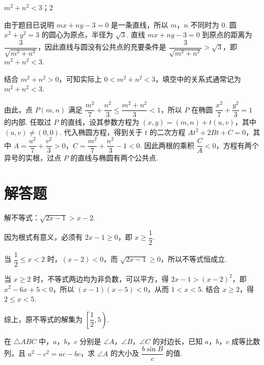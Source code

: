 \begin{answer}
\(m^{2}+n^{2}<3\)；\(2\)
\end{answer}

\begin{solution}
由于题目已说明 \(mx+ny-3=0\) 是一条直线，所以 \(m\)，\(n\) 不同时为 \(0\). 圆 \(x^{2}+y^{2}=3\) 的圆心为原点，半径为 \(\sqrt3\). 直线 \(mx+ny-3=0\) 到原点的距离为 \(\dfrac{3}{\sqrt{m^{2}+n^{2}}}\)，因此直线与圆没有公共点的充要条件是
\(\dfrac{3}{\sqrt{m^{2}+n^{2}}}>\sqrt3\)，即 \(m^{2}+n^{2}<3\).

结合 \(m^{2}+n^{2}>0\)，可知实际上 \(0<m^{2}+n^{2}<3\)，填空中的关系式通常记为 \(m^{2}+n^{2}<3\).

由此，点 \(P\left(m,n\right)\) 满足 \(\dfrac{m^{2}}{7}+\dfrac{n^{2}}{3}\leq\dfrac{m^{2}+n^{2}}{3}<1\)，所以 \(P\) 在椭圆 \(\dfrac{x^{2}}7+\dfrac{y^{2}}3=1\) 的内部. 任取过 \(P\) 的直线，设其参数方程为 \(\left(x,y\right)=\left(m,n\right)+t\left(u,v\right)\)，其中 \(\left(u,v\right)\ne\left(0,0\right)\). 代入椭圆方程，得到关于 \(t\) 的二次方程 \(At^{2}+2Bt+C=0\)，其中 \(A=\dfrac{u^{2}}7+\dfrac{v^{2}}3>0\)，\(C=\dfrac{m^{2}}7+\dfrac{n^{2}}3-1<0\). 因此两根的乘积 \(\dfrac{C}{A}<0\)，方程有两个异号的实根，过点 \(P\) 的直线与椭圆有两个公共点.
\end{solution}

\section{解答题}

\begin{problem}
解不等式：\(\sqrt{2x-1}>x-2\).
\end{problem}

\begin{solution}
因为根式有意义，必须有 \(2x-1\geq0\)，即 \(x\geq\dfrac{1}{2}\).

当 \(\dfrac{1}{2}\leq x<2\) 时，\(\left(x-2\right)<0\)，而 \(\sqrt{2x-1}\geq0\)，所以不等式恒成立.

当 \(x\geq2\) 时，不等式两边均为非负数，可以平方，得 \(2x-1>\left(x-2\right)^{2}\)，即 \(x^{2}-6x+5<0\)，所以 \(\left(x-1\right)\left(x-5\right)<0\)，从而 \(1<x<5\). 结合 \(x\geq2\)，得 \(2\leq x<5\).

综上，原不等式的解集为 \(\left[\dfrac{1}{2},5\right)\).
\end{solution}

\begin{problem}
在 \(\triangle ABC\) 中，\(a\)，\(b\)，\(c\) 分别是 \(\angle A\)，\(\angle B\)，\(\angle C\) 的对边长，已知 \(a\)，\(b\)，\(c\) 成等比数列，且 \(a^{2}-c^{2}=ac-bc\)，求 \(\angle A\) 的大小及 \(\dfrac{b\sin B}{c}\) 的值.
\end{problem}

